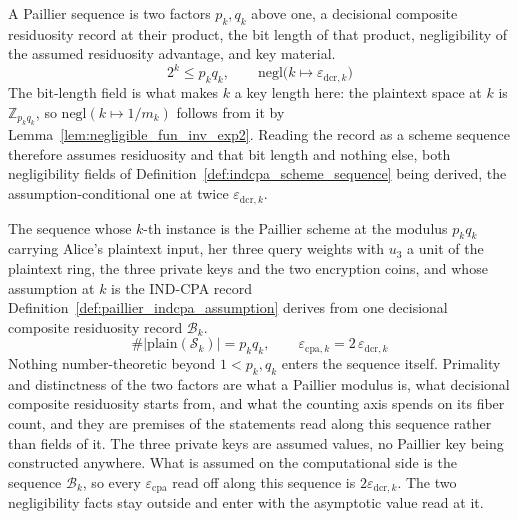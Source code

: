 \begin{definition}
  \label{def:paillier_scheme_sequence}
  \rocqok
  A Paillier sequence is two factors $p_k, q_k$ above one, a decisional
  composite residuosity record at their product, the bit length of that
  product, negligibility of the assumed residuosity advantage, and key
  material.
  \[ 2^k \le p_k q_k, \qquad
     \mathrm{negl}\big(k \mapsto \varepsilon_{\mathrm{dcr},k}\big) \]
  The bit-length field is what makes $k$ a key length here: the plaintext space
  at $k$ is $\mathbb{Z}_{p_k q_k}$, so $\mathrm{negl}(k \mapsto 1/m_k)$ follows
  from it by Lemma~\ref{lem:negligible_fun_inv_exp2}. Reading the record as a
  scheme sequence therefore assumes residuosity and that bit length and nothing
  else, both negligibility fields of
  Definition~\ref{def:indcpa_scheme_sequence} being derived, the
  assumption-conditional one at twice $\varepsilon_{\mathrm{dcr},k}$.
\end{definition}

\begin{definition}
  \label{def:paillier_setting}
  \rocqok
  The sequence whose $k$-th instance is the Paillier scheme at the modulus
  $p_k q_k$ carrying Alice's plaintext input, her three query weights with
  $u_3$ a unit of the plaintext ring, the three private keys and the two
  encryption coins, and whose assumption at $k$ is the IND-CPA record
  Definition~\ref{def:paillier_indcpa_assumption} derives from one decisional
  composite residuosity record $\mathcal{B}_k$.
  \[ \#\lvert\mathrm{plain}(\mathcal{S}_k)\rvert = p_k q_k, \qquad
     \varepsilon_{\mathrm{cpa},k} = 2\,\varepsilon_{\mathrm{dcr},k} \]
  Nothing number-theoretic beyond $1 < p_k, q_k$ enters the sequence itself.
  Primality and distinctness of the two factors are what a Paillier modulus
  is, what decisional composite residuosity starts from, and what the counting
  axis spends on its fiber count, and they are premises of the statements read
  along this sequence rather than fields of it. The three private keys are
  assumed values, no Paillier key being constructed anywhere. What is assumed
  on the computational side is the sequence $\mathcal{B}_k$, so every
  $\varepsilon_{\mathrm{cpa}}$ read off along this sequence is
  $2\varepsilon_{\mathrm{dcr},k}$. The two negligibility facts stay outside and
  enter with the asymptotic value read at it.
\end{definition}

